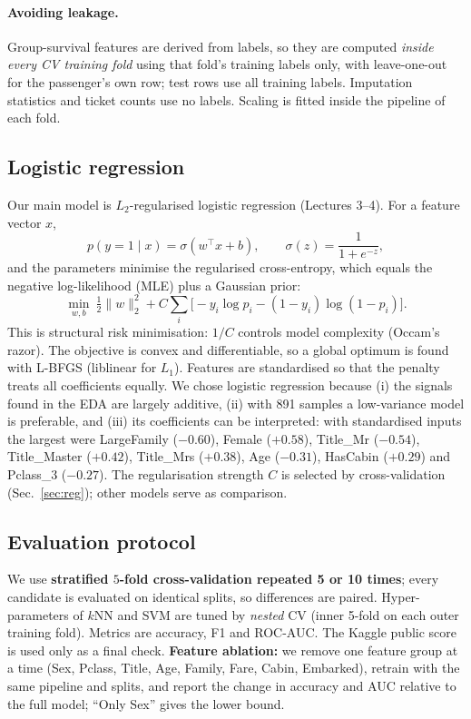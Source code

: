 \documentclass[10pt,twocolumn]{article}
\begin{document}
\paragraph{Avoiding leakage.} Group-survival features are derived from labels, so they are computed \emph{inside every CV training fold} using that fold's training labels only, with leave-one-out for the passenger's own row; test rows use all training labels. Imputation statistics and ticket counts use no labels. Scaling is fitted inside the pipeline of each fold.

\subsection{Logistic regression}
Our main model is $L_2$-regularised logistic regression (Lectures 3--4). For a feature vector $x$,
\[
p(y{=}1\mid x)=\sigma(w^\top x+b),\qquad \sigma(z)=\frac{1}{1+e^{-z}},
\]
and the parameters minimise the regularised cross-entropy, which equals the negative log-likelihood (MLE) plus a Gaussian prior:
\[
\min_{w,b}\ \tfrac12\|w\|_2^2 + C\sum_{i}\big[-y_i\log p_i-(1-y_i)\log(1-p_i)\big].
\]
This is structural risk minimisation: $1/C$ controls model complexity (Occam's razor). The objective is convex and differentiable, so a global optimum is found with L-BFGS (liblinear for $L_1$). Features are standardised so that the penalty treats all coefficients equally. We chose logistic regression because (i) the signals found in the EDA are largely additive, (ii) with 891 samples a low-variance model is preferable, and (iii) its coefficients can be interpreted: with standardised inputs the largest were LargeFamily ($-0.60$), Female ($+0.58$), Title\_Mr ($-0.54$), Title\_Master ($+0.42$), Title\_Mrs ($+0.38$), Age ($-0.31$), HasCabin ($+0.29$) and Pclass\_3 ($-0.27$). The regularisation strength $C$ is selected by cross-validation (Sec.~\ref{sec:reg}); other models serve as comparison.

\subsection{Evaluation protocol}
We use \textbf{stratified $5$-fold cross-validation repeated 5 or 10 times}; every candidate is evaluated on identical splits, so differences are paired. Hyper-parameters of $k$NN and SVM are tuned by \emph{nested} CV (inner 5-fold on each outer training fold). Metrics are accuracy, F1 and ROC-AUC. The Kaggle public score is used only as a final check. \textbf{Feature ablation:} we remove one feature group at a time (Sex, Pclass, Title, Age, Family, Fare, Cabin, Embarked), retrain with the same pipeline and splits, and report the change in accuracy and AUC relative to the full model; ``Only Sex'' gives the lower bound.
\end{document}
